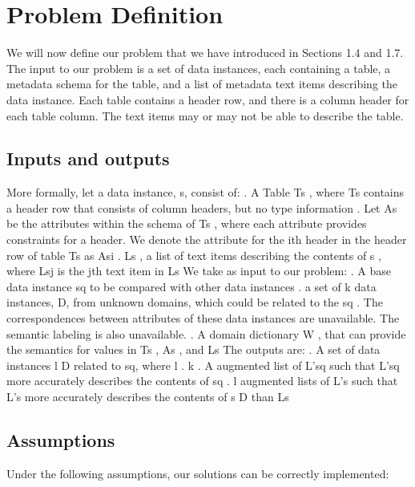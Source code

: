 \section{Problem Definition}
\label{sec:ProblemDefinition}

We will now define our problem that we have introduced in Sections 1.4 and 1.7. The input to our problem is a set of data instances, each containing a table, a metadata schema for the table, and a list of metadata text items describing the data instance. Each table contains a header row, and there is a column header for each table column. The text items may or may not be able to describe the table.

\subsection{Inputs and outputs}
More formally, let a data instance, s, consist of:
. A Table Ts , where Ts contains a header row that consists of column headers, but no type information
. Let As be the attributes within the schema of Ts , where each attribute provides constraints for a header. We denote the attribute for the ith header in the header row of table Ts as Asi
. Ls , a list of text items describing the contents of s , where Lsj is the jth text item in Ls
We take as input to our problem:
. A base data instance sq to be compared with other data instances
. a set of k data instances, D, from unknown domains, which could be related to the sq . The correspondences between attributes of these data instances are unavailable. The semantic labeling is also unavailable.
. A domain dictionary W , that can provide the semantics for values in Ts , As , and Ls
The outputs are:
. A set of data instances l  D related to sq, where l . k
. A augmented list of L'sq such that L'sq more accurately describes the contents of sq
. l augmented lists of L's such that L's more accurately describes the contents of s  D than Ls

\subsection{Assumptions}
Under the following assumptions, our solutions can be correctly implemented:

